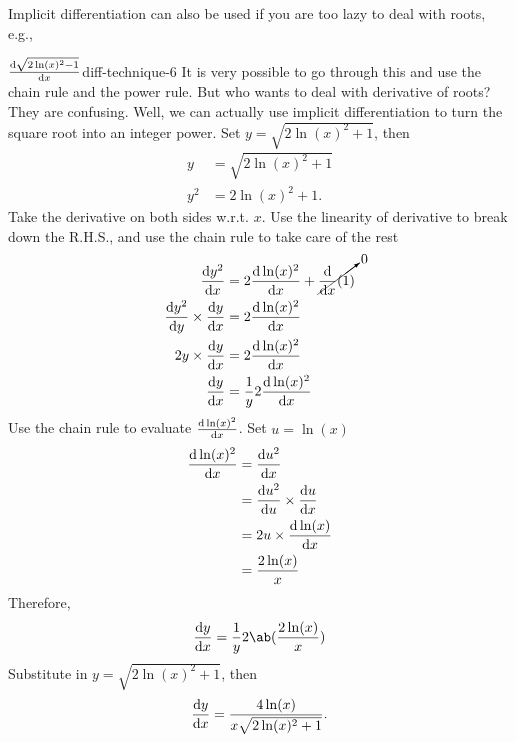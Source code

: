 Implicit differentiation can also be used if you are too lazy to deal with roots, e.g.,
\begin{exmp}{$\odv{\sqrt{2\ln(x)^2 - 1}}{x}$}{diff-technique-6}
  It is very possible to go through this and use the chain rule and the power rule. But who wants to deal with derivative of roots? They are confusing. Well, we can actually use implicit differentiation to turn the square root into an integer power. Set $y = \sqrt{2\ln(x)^2 + 1}$, then
  \begin{align}
    y   & = \sqrt{2\ln(x)^2 + 1} \\
    y^2 & = 2\ln(x)^2 + 1.
  \end{align}
  Take the derivative on both sides w.r.t. $x$. Use the linearity of derivative to break down the R.H.S., and use the chain rule to take care of the rest
  \begin{align}
    \odv{y^2}{x}                 & = 2\odv{\ln(x)^2}{x} + \cancelto{0}{\odv*{(1)}{x}} \\
    \odv{y^2}{y}\times\odv{y}{x} & = 2\odv{\ln(x)^2}{x}                               \\
    2y\times\odv{y}{x}           & = 2\odv{\ln(x)^2}{x}                               \\
    \odv{y}{x}                   & = \frac{1}{y}2\odv{\ln(x)^2}{x}
  \end{align}
  Use the chain rule to evaluate $\odv{\ln(x)^2}{x}$. Set $u = \ln(x)$
  \begin{align}
    \odv{\ln(x)^2}{x} & = \odv{u^2}{x}                   \\
                      & = \odv{u^2}{u} \times \odv{u}{x} \\
                      & = 2u \times \odv{\ln(x)}{x}      \\
                      & = \frac{2\ln(x)}{x}
  \end{align}
  Therefore,
  \begin{equation}
    \odv{y}{x} = \frac{1}{y}2\ab(\frac{2\ln(x)}{x})
  \end{equation}
  Substitute in $y = \sqrt{2\ln(x)^2 + 1}$, then
  \begin{equation}
    \odv{y}{x} = \frac{4\ln(x)}{x\sqrt{ 2\ln(x)^2 + 1 }}.
  \end{equation}
\end{exmp}

